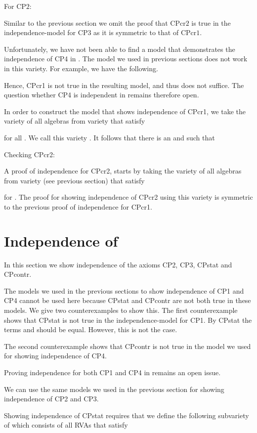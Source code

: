 \documentclass[a4paper,twoside,openright]{report}
\newcommand{\CP}[1]{\ensuremath{\mathrm{CP#1}}}
\newcommand{\CPcr}[1]{\ensuremath{\mathrm{CPcr#1}}}
\begin{document}
For \CP2:


Similar to the previous section we omit the proof that \CPcr2 is true in the independence-model for \CP3 as it is symmetric to that of \CPcr1.


Unfortunately, we have not been able to find a model that demonstrates the independence of CP4 in . The model we used in previous sections does not work in this variety. For example, we have the following.

Hence, CPcr1 is not true in the resulting model, and thus  does not suffice. The question whether CP4 is independent in  remains therefore open.

In order to construct the model that shows independence of CPcr1, we take the variety of all algebras from variety  that satisfy

for all . We call this variety . It follows that there is an  and  such that 

Checking CPcr2:



A proof of independence for CPcr2, starts by taking the variety of all algebras from variety  (see previous section) that satisfy

for . The proof for showing independence of CPcr2 using this variety is symmetric to the previous proof of independence for CPcr1.

\section{Independence of }
In this section we show independence of the axioms CP2, CP3, CPstat and CPcontr.

The models we used in the previous sections to show independence of CP1 and CP4 cannot be used here because CPstat and CPcontr are not both true in these models. We give two counterexamples to show this. The first counterexample shows that CPstat is not true in the independence-model for CP1. By CPstat the terms  and  should be equal. However, this is not the case.
 

The second counterexample shows that CPcontr is not true in the model we used for showing independence of CP4.

Proving independence for both CP1 and CP4 in  remains an open issue.

We can use the same models we used in the previous section for showing independence of CP2 and CP3.




Showing independence of CPstat requires that we define the following subvariety of  which consists of all RVAs that satisfy
\end{document}
